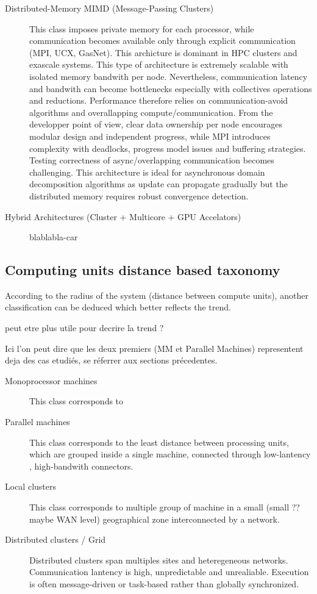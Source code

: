 \begin{description}
\item[Distributed-Memory MIMD (Message-Passing Clusters)] 
This class imposes private memory for each processor, while communication becomes available only through explicit communication (MPI, UCX, GasNet). This archicture is dominant in HPC clusters and exascale systems. This type of architecture is extremely scalable with isolated memory bandwith per node. Nevertheless, communication latency and bandwith can become bottlenecks especially with collectives operations and reductions. Performance therefore relies on communication-avoid algorithms and overallapping compute/communication. From the developper point of view, clear data ownership per node encourages modular design and independent progress, while MPI introduces complexity with deadlocks, progress model issues and buffering strategies. Testing correctness of async/overlapping communication becomes challenging. This architecture is ideal for asynchronous domain decomposition algorithms as update can propagate gradually but the distributed memory requires robust convergence detection. 


\item[Hybrid Architectures (Cluster + Multicore + GPU Accelators)] blablabla-car


\end{description}



\subsection{Computing units distance based taxonomy}

According to the radius of the system (distance between compute units), another classification can be deduced which better reflects the trend.

peut etre plus utile pour decrire la trend ?

Ici l'on peut dire que les deux premiers (MM et Parallel Machines) representent deja des cas etudiés, se réferrer aux sections précedentes.

\begin{description}
\item[Monoprocessor machines] This class corresponds to 


\item[Parallel machines] This class corresponds to the least distance between processing units, which are grouped inside a single machine, connected through low-lantency , high-bandwith connectors. 

\item[Local clusters] This class corresponds to multiple group of machine in a small (small ?? maybe WAN level) geographical zone interconnected by a network.  


\item[Distributed clusters / Grid]
Distributed clusters span multiples sites and heteregeneous networks. Communication lantency is high, unpredictable and unrealiable. Execution is often message-driven or task-based rather than globally synchronized. 


\end{description}


